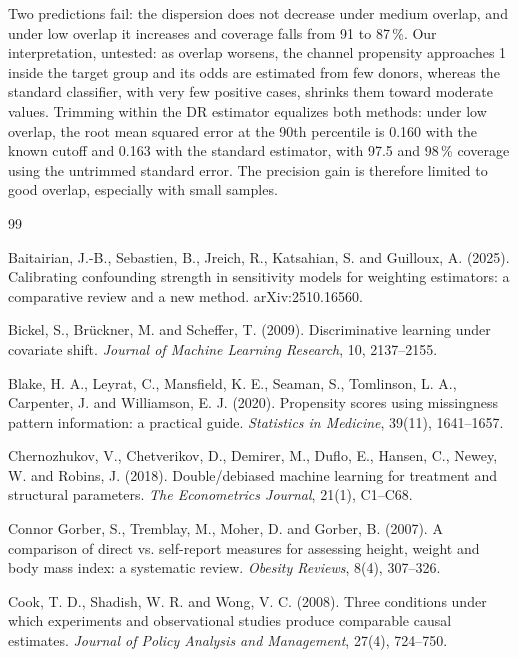 \documentclass[11pt,a4paper]{article}
\theoremstyle{plain}
\theoremstyle{definition}
\begin{document}
Two predictions fail: the dispersion does not decrease under medium overlap, and under low overlap it increases and coverage falls from 91 to 87\,\%. Our interpretation, untested: as overlap worsens, the channel propensity approaches 1 inside the target group and its odds are estimated from few donors, whereas the standard classifier, with very few positive cases, shrinks them toward moderate values. Trimming within the DR estimator equalizes both methods: under low overlap, the root mean squared error at the 90th percentile is 0.160 with the known cutoff and 0.163 with the standard estimator, with 97.5 and 98\,\% coverage using the untrimmed standard error. The precision gain is therefore limited to good overlap, especially with small samples.

\begin{thebibliography}{99}\small

 Baitairian, J.-B., Sebastien, B., Jreich, R., Katsahian, S. and Guilloux, A. (2025). Calibrating confounding strength in sensitivity models for weighting estimators: a comparative review and a new method. arXiv:2510.16560.

 Bickel, S., Brückner, M. and Scheffer, T. (2009). Discriminative learning under covariate shift. \emph{Journal of Machine Learning Research}, 10, 2137--2155.

 Blake, H. A., Leyrat, C., Mansfield, K. E., Seaman, S., Tomlinson, L. A., Carpenter, J. and Williamson, E. J. (2020). Propensity scores using missingness pattern information: a practical guide. \emph{Statistics in Medicine}, 39(11), 1641--1657.

 Chernozhukov, V., Chetverikov, D., Demirer, M., Duflo, E., Hansen, C., Newey, W. and Robins, J. (2018). Double/debiased machine learning for treatment and structural parameters. \emph{The Econometrics Journal}, 21(1), C1--C68.

 Connor Gorber, S., Tremblay, M., Moher, D. and Gorber, B. (2007). A comparison of direct vs. self-report measures for assessing height, weight and body mass index: a systematic review. \emph{Obesity Reviews}, 8(4), 307--326.

 Cook, T. D., Shadish, W. R. and Wong, V. C. (2008). Three conditions under which experiments and observational studies produce comparable causal estimates. \emph{Journal of Policy Analysis and Management}, 27(4), 724--750.


\end{thebibliography}
\end{document}
